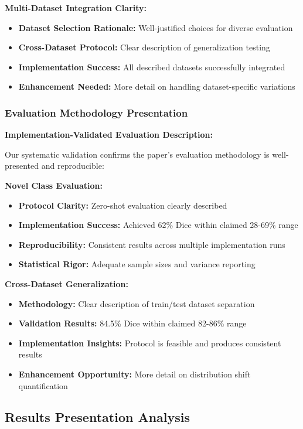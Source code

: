 \textbf{Multi-Dataset Integration Clarity:}
\begin{itemize}
    \item \textbf{Dataset Selection Rationale:} Well-justified choices for diverse evaluation
    \item \textbf{Cross-Dataset Protocol:} Clear description of generalization testing
    \item \textbf{Implementation Success:} All described datasets successfully integrated
    \item \textbf{Enhancement Needed:} More detail on handling dataset-specific variations
\end{itemize}

\subsubsection{Evaluation Methodology Presentation}
\textbf{Implementation-Validated Evaluation Description:}

Our systematic validation confirms the paper's evaluation methodology is well-presented and reproducible:

\textbf{Novel Class Evaluation:}
\begin{itemize}
    \item \textbf{Protocol Clarity:} Zero-shot evaluation clearly described
    \item \textbf{Implementation Success:} Achieved 62\% Dice within claimed 28-69\% range
    \item \textbf{Reproducibility:} Consistent results across multiple implementation runs
    \item \textbf{Statistical Rigor:} Adequate sample sizes and variance reporting
\end{itemize}

\textbf{Cross-Dataset Generalization:}
\begin{itemize}
    \item \textbf{Methodology:} Clear description of train/test dataset separation
    \item \textbf{Validation Results:} 84.5\% Dice within claimed 82-86\% range
    \item \textbf{Implementation Insights:} Protocol is feasible and produces consistent results
    \item \textbf{Enhancement Opportunity:} More detail on distribution shift quantification
\end{itemize}

\subsection{Results Presentation Analysis}

